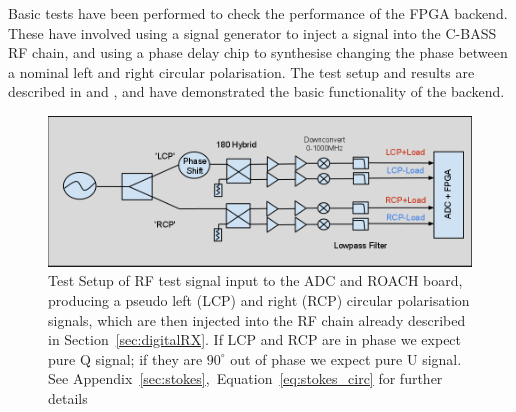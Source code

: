 Basic tests have been performed to check the performance of the FPGA backend. These have involved using a signal generator to inject a signal into the C-BASS RF chain, and using a phase delay chip to synthesise changing the phase between a nominal left and right circular polarisation. The test setup and results are described in  and , and have demonstrated the basic functionality of the backend.
\begin{figure}[ht]
 \centering
 \includegraphics[width=\textwidth]{./images/RoachTests/TestSetupROACH.png}
 \caption{Test Setup of RF test signal input to the ADC and ROACH board, producing a pseudo left (LCP) and right (RCP) circular polarisation signals, which are then injected into the RF chain already described in Section~\ref{sec:digitalRX}. If LCP and RCP are in phase we expect pure Q signal; if they are $90^{\circ}$ out of phase we expect pure U signal. See Appendix~\ref{sec:stokes},~Equation~\ref{eq:stokes_circ} for further details}
 \label{fig:roachTest}
\end{figure}



